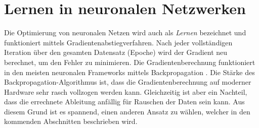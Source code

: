 %
%
%
\section{Lernen in neuronalen Netzwerken
\label{ableitung:section:problemstellung}}
Die Optimierung von neuronalen Netzen wird auch als {\em Lernen}
bezeichnet und funktioniert mittels Gradientenabstiegverfahren.
%
Nach jeder vollständigen Iteration über den gesamten Datensatz (Epoche) wird der Gradient neu berechnet, um den Fehler zu minimieren.
%
Die Gradientenberechnung funktioniert in den meisten neuronalen Frameworks mittels Backpropagation \cite{ableitung:backprop}.
%
Die Stärke des Backpropagation-Algorithmus ist, dass die Gradientenberechnung auf moderner Hardware sehr rasch vollzogen werden kann.
Gleichzeitig ist aber ein Nachteil, dass die errechnete Ableitung anfällig für Rauschen der Daten sein kann.
Aus diesem Grund ist es spannend, einen anderen Ansatz zu wählen, welcher in den kommenden Abschnitten beschrieben wird.

